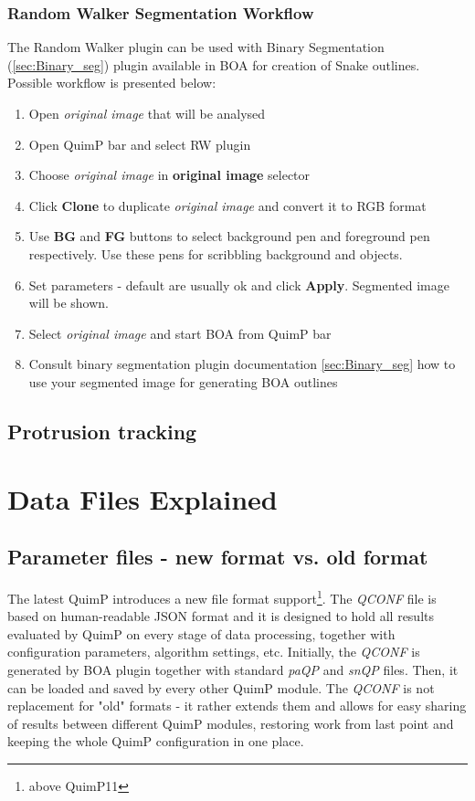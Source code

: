 \documentclass[a4paper,12pt]{article}
\begin{document}
\subsubsection{Random Walker Segmentation Workflow}

The Random Walker plugin can be used with Binary Segmentation (\ref{sec:Binary_seg}) plugin available in BOA for creation of Snake outlines. Possible workflow is presented below:

\begin{enumerate}
	\item Open \textit{original image} that will be analysed
	\item Open QuimP bar and select RW plugin
	\item Choose \textit{original image} in \textbf{original image} selector
	\item Click \textbf{Clone} to duplicate \textit{original image} and convert it to RGB format
	\item Use \textbf{BG} and \textbf{FG} buttons to select background pen and foreground pen respectively. Use these pens for scribbling background and objects.
	\item Set parameters - default are usually ok and click \textbf{Apply}. Segmented image will be shown.
	\item Select \textit{original image} and start BOA from QuimP bar
	\item Consult binary segmentation plugin documentation \ref{sec:Binary_seg} how to use your segmented image for generating BOA outlines   
\end{enumerate}

\subsection{Protrusion tracking}
\label{sec:PtrotTracking}

 
\section{Data Files Explained}

\subsection{Parameter files - new format vs. old format}
The latest QuimP introduces a new file format support\footnote{above QuimP11}. The \textit{QCONF} file is based on human-readable JSON format and it is designed to hold all results evaluated by QuimP on every stage of data processing, together with configuration parameters, algorithm settings, etc. 
Initially, the \textit{QCONF} is generated by BOA plugin together with standard \textit{paQP} and \textit{snQP} files. Then, it can be loaded and saved by every other QuimP module. The \textit{QCONF} is not replacement for "old" formats - it rather extends them and allows for easy sharing of results between different QuimP modules, restoring work from last point and keeping the whole QuimP configuration in one place.   
\end{document}
